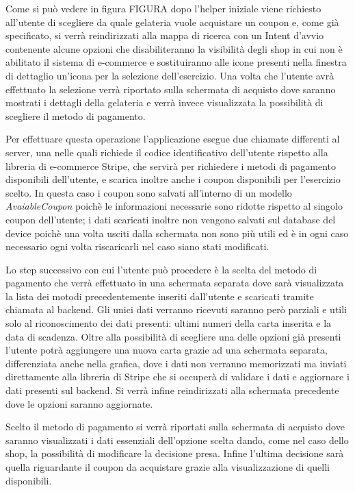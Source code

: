 Come si può vedere in figura FIGURA dopo l'helper iniziale viene richiesto
all'utente di scegliere da quale gelateria vuole acquistare un coupon
e, come già specificato, si verrà reindirizzati alla mappa di ricerca
con un Intent d'avvio contenente alcune opzioni che disabiliteranno
la visibilità degli shop in cui non è abilitato il sistema di e-commerce
e sostituiranno alle icone presenti nella finestra di dettaglio un'icona
per la selezione dell'esercizio. Una volta che l'utente avrà effettuato
la selezione verrà riportato sulla schermata di acquisto dove saranno
mostrati i dettagli della gelateria e verrà invece visualizzata la
possibilità di scegliere il metodo di pagamento.

Per effettuare questa operazione l'applicazione esegue due chiamate
differenti al server, una nelle quali richiede il codice identificativo
dell'utente rispetto alla libreria di e-commerce Stripe, che servirà
per richiedere i metodi di pagamento disponibili dell'utente, e scarica
inoltre anche i coupon disponibili per l'esercizio scelto. In questa
caso i coupon sono salvati all'interno di un modello \emph{AvaiableCoupon
}poichè le informazioni necessarie sono ridotte rispetto al singolo
coupon dell'utente; i dati scaricati inoltre non vengono salvati sul
database del device poichè una volta usciti dalla schermata non sono
più utili ed è in ogni caso necessario ogni volta riscaricarli nel
caso siano stati modificati.

Lo step successivo con cui l'utente può procedere è la scelta del
metodo di pagamento che verrà effettuato in una schermata separata
dove sarà visualizzata la lista dei motodi precedentemente inseriti
dall'utente e scaricati tramite chiamata al backend. Gli unici dati
verranno ricevuti saranno però parziali e utili solo al riconoscimento
dei dati presenti: ultimi numeri della carta inserita e la data di
scadenza. Oltre alla possibilità di scegliere una delle opzioni già
presenti l'utente potrà aggiungere una nuova carta grazie ad una schermata
separata, differenziata anche nella grafica, dove i dati non verranno
memorizzati ma inviati direttamente alla libreria di Stripe che si
occuperà di validare i dati e aggiornare i dati presenti sul backend.
Si verrà infine reindirizzati alla schermata precedente dove le opzioni
saranno aggiornate.

Scelto il metodo di pagamento si verrà riportati sulla schermata di
acquisto dove saranno visualizzati i dati essenziali dell'opzione
scelta dando, come nel caso dello shop, la possibilità di modificare
la decisione presa. Infine l'ultima decisione sarà quella riguardante
il coupon da acquistare grazie alla visualizzazione di quelli disponibili.

